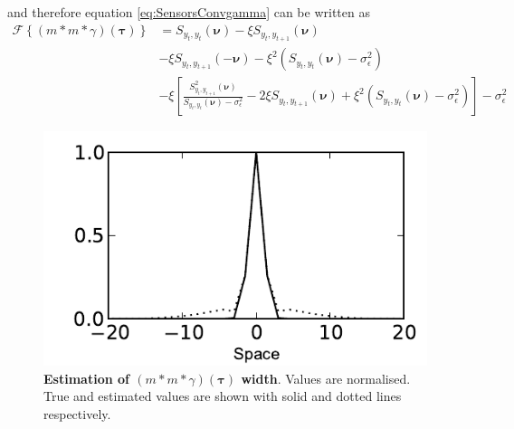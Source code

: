 \documentclass[]{article}
\begin{document}
and therefore equation \ref{eq:SensorsConvgamma} can be written as 
\begin{align}
 \mathcal{F}\left\{\left(m\ast m\ast \gamma\right)\left(\boldsymbol\tau\right)\right\}&=S_{y_{t},y_{t}}\left(\boldsymbol\nu\right)-\xi S_{y_{t},y_{t+1}}\left(\boldsymbol\nu\right) \nonumber \\
&-\xi S_{y_{t},y_{t+1}}\left(-\boldsymbol\nu\right)-\xi^2 \left(S_{y_{t},y_{t}}\left(\boldsymbol\nu\right)-\sigma_{\epsilon}^2\right) \nonumber\\
&-\xi  \left[\frac{S_{y_{t},y_{t+1}}^2\left(\boldsymbol\nu\right)}{S_{y_{t},y_{t}}\left(\boldsymbol\nu\right)-\sigma_{\epsilon}^2}-2\xi S_{y_{t},y_{t+1}}\left(\boldsymbol\nu\right)+\xi^2\left(S_{y_{t},y_{t}}\left(\boldsymbol\nu\right)-\sigma_{\epsilon}^2\right)\right]-\sigma_{\epsilon}^2
\end{align}
\begin{figure}[!ht]
\begin{center}
\includegraphics{./Figures/DisturbanceWidthEstimation.pdf}
\end{center}
\caption{{\bf Estimation of $\left(m\ast m \ast \gamma \right)\left(\boldsymbol \tau\right) $ width}. Values are normalised. True  and estimated values are shown with solid and dotted lines respectively.}
\label{fig:DisturbanceWidth}
\end{figure}
\end{document}
